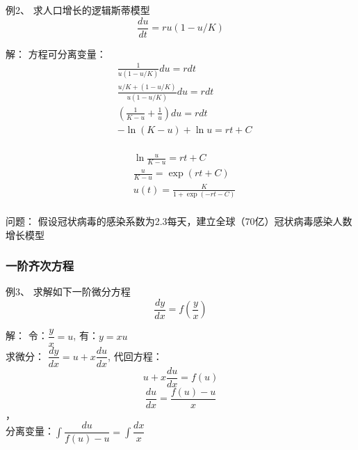 \begin{frame}
	\begin{exampleblock} {例2、	求人口增长的逻辑斯蒂模型}
	\begin{equation*}
		\frac{d u}{d t}=r u (1-u/K)
	\end{equation*}
	\end{exampleblock} 	
	\alert{解：} 方程可分离变量：
	\begin{align*}
		&\frac{1}{u(1-u / K)}du =r d t \\
		&\frac{u / K+(1-u / K)}{u(1-u / K)} d u =r d t	\\
		&(\frac{1}{K-u}+\frac{1}{u} ) d u =r d t \\
		&-\ln (K-u)+\ln u =r t+C \\
	\end{align*}	
\end{frame}

\begin{frame}
	\begin{align*}
		&\ln \frac{u}{K-u}  = r t+C\\
		&\frac{u}{K-u} = \exp (r t+C)\\
		&u(t) = \frac{K}{1+ \exp (-r t-C)}	\\
	\end{align*}	
	\begin{block} {问题：}
	假设冠状病毒的感染系数为2.3每天，建立全球（70亿）冠状病毒感染人数增长模型
	\end{block}    
\end{frame}

\begin{frame}
	\frametitle{一阶齐次方程 }
	\begin{exampleblock} {例3、	求解如下一阶微分方程}
	\begin{equation*}
		\frac{d y}{d x}=f\left(\frac{y}{x}\right) 
	\end{equation*}
	\end{exampleblock} 	
	\alert{解：} 令：$\dfrac{y}{x}=u$, 有：$y=xu$ \\ 
	求微分： $ \dfrac{d y}{d x}=u+x \dfrac{d u}{d x}$,	代回方程：\\	
	 \[ u+x \dfrac{d u}{d x}=f(u)\]  \[ \dfrac{d u}{d x}=\dfrac{f(u)-u}{x}\] ，\\ \vspace{0.2cm}
	分离变量：$\int \dfrac{d u}{f(u)-u}=\int \dfrac{d x}{x}$ 		
\end{frame}

